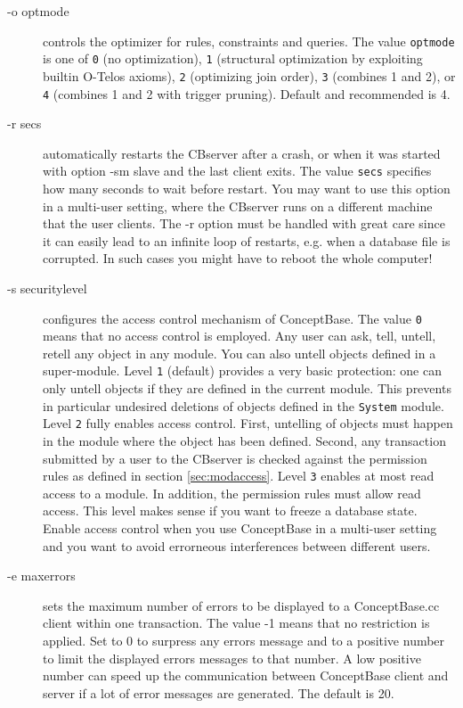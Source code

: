 \begin{description}
\item[-o optmode] controls the optimizer for rules, constraints and queries.
The value {\tt optmode} is one of {\tt 0} (no optimization), {\tt 1}
(structural optimization by exploiting builtin O-Telos axioms),
{\tt 2} (optimizing join order), {\tt 3} (combines 1 and 2), or
{\tt 4} (combines 1 and 2 with trigger pruning). Default
and recommended is 4.

\item[-r secs] automatically restarts the CBserver after a crash, or when it was
started with option -sm slave and the last client exits.
The value {\tt secs} specifies how many seconds to wait before restart.
You may want to use this option in a multi-user setting, where the CBserver
runs on a different machine that the user clients. The -r option must be handled with
great care since it can easily lead to an infinite loop of restarts, e.g. when
a database file is corrupted. In such cases you might have to reboot the whole computer!


\item[-s securitylevel] configures the access control mechanism of
ConceptBase. The value {\tt 0} means that no access control is employed.
Any user can ask, tell, untell, retell any object in any module. You
can also untell objects defined in a super-module.
Level {\tt 1} (default)  provides a very basic protection: one can only
untell objects if they are defined in the current module. This
prevents in particular undesired deletions of objects defined in
the {\tt System} module.
Level {\tt 2} fully enables access control. First, untelling of objects must
happen in the module where the object has been defined. Second, any
transaction submitted by a user to the CBserver is checked against the
permission rules as defined in section \ref{sec:modaccess}.
Level {\tt 3} enables at most read access to a module. In addition, the permission rules
must allow read access. This level makes sense if you want to freeze a database state.
Enable access control
when you use ConceptBase in a multi-user setting and you want to avoid errorneous
interferences between different users.

\item[-e maxerrors] sets the maximum number of errors to be displayed to a ConceptBase.cc
client within one transaction. The value -1 means that no restriction is applied.
Set to 0 to surpress any errors message and to a positive number to limit the
displayed errors messages to that number. A low positive number can speed up the
communication between ConceptBase client and server if a lot of error messages
are generated. The default is 20.


\end{description}
